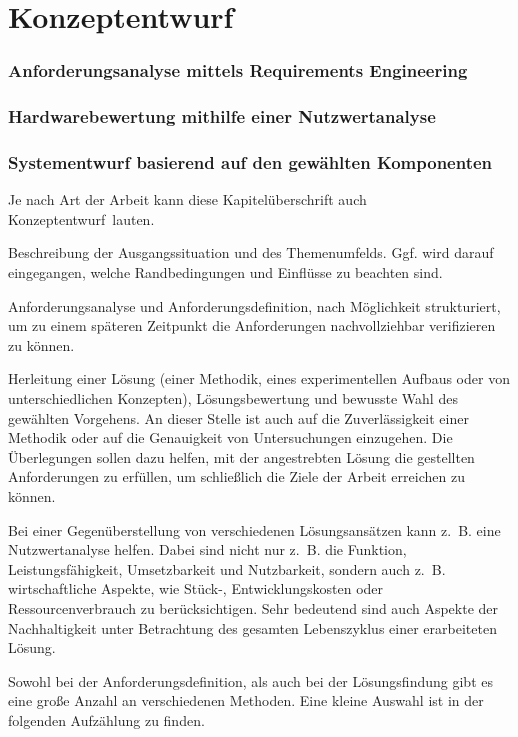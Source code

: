 \chapter{Konzeptentwurf}
\label{cha:vorgehen}

\subsection{Anforderungsanalyse mittels Requirements Engineering}

\subsection{Hardwarebewertung mithilfe einer Nutzwertanalyse}

\subsection{Systementwurf basierend auf den gewählten Komponenten}

Je nach Art der Arbeit kann diese Kapitelüberschrift auch \glqq Konzeptentwurf\grqq~lauten.

Beschreibung der Ausgangssituation und des Themenumfelds. Ggf. wird darauf eingegangen, welche Randbedingungen und Einflüsse zu beachten sind.

Anforderungsanalyse und Anforderungsdefinition, nach Möglichkeit strukturiert, um zu einem späteren Zeitpunkt die Anforderungen nachvollziehbar verifizieren zu können.

Herleitung einer Lösung (einer Methodik, eines experimentellen Aufbaus oder von unterschiedlichen Konzepten), Lösungsbewertung und bewusste Wahl des gewählten Vorgehens. An dieser Stelle ist auch auf die Zuverlässigkeit einer Methodik oder auf die Genauigkeit von Untersuchungen einzugehen. Die Überlegungen sollen dazu helfen, mit der angestrebten Lösung die gestellten Anforderungen zu erfüllen, um schließlich die Ziele der Arbeit erreichen zu können.

Bei einer Gegenüberstellung von verschiedenen Lösungsansätzen kann z.~B. eine Nutzwertanalyse helfen. Dabei sind nicht nur z.~B. die Funktion, Leistungsfähigkeit, Umsetzbarkeit und Nutzbarkeit, sondern auch z.~B. wirtschaftliche Aspekte, wie Stück-, Entwicklungskosten oder Ressourcenverbrauch zu berücksichtigen. Sehr bedeutend sind auch Aspekte der Nachhaltigkeit unter Betrachtung des gesamten Lebenszyklus einer erarbeiteten Lösung.

Sowohl bei der Anforderungsdefinition, als auch bei der Lösungsfindung gibt es eine große Anzahl an verschiedenen Methoden. Eine kleine Auswahl ist in der folgenden Aufzählung zu finden.

